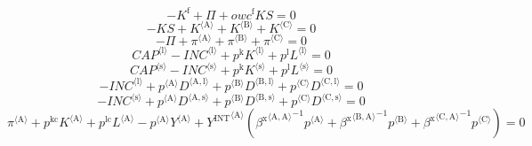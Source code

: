 \begin{equation}
-K^{\mathrm{f}} + \Pi + {{o\!w\!c}^{\mathrm{f}}} {{K\!S}} = 0
\end{equation}
\begin{equation}
-{K\!S} + {K}^{\langle \mathrm{A}\rangle} + {K}^{\langle \mathrm{B}\rangle} + {K}^{\langle \mathrm{C}\rangle} = 0
\end{equation}
\begin{equation}
-\Pi + {\pi}^{\langle \mathrm{A}\rangle} + {\pi}^{\langle \mathrm{B}\rangle} + {\pi}^{\langle \mathrm{C}\rangle} = 0
\end{equation}
\begin{equation}
{{C\!A\!P}}^{\langle \mathrm{l}\rangle} - {{I\!N\!C}}^{\langle \mathrm{l}\rangle} + {p^{\mathrm{k}}} {{K}^{\langle \mathrm{l}\rangle}} + {p^{\mathrm{l}}} {{L}^{\langle \mathrm{l}\rangle}} = 0
\end{equation}
\begin{equation}
{{C\!A\!P}}^{\langle \mathrm{s}\rangle} - {{I\!N\!C}}^{\langle \mathrm{s}\rangle} + {p^{\mathrm{k}}} {{K}^{\langle \mathrm{s}\rangle}} + {p^{\mathrm{l}}} {{L}^{\langle \mathrm{s}\rangle}} = 0
\end{equation}
\begin{equation}
-{{I\!N\!C}}^{\langle \mathrm{l}\rangle} + {{p}^{\langle \mathrm{A}\rangle}} {{D}^{\langle \mathrm{A},\mathrm{l}\rangle}} + {{p}^{\langle \mathrm{B}\rangle}} {{D}^{\langle \mathrm{B},\mathrm{l}\rangle}} + {{p}^{\langle \mathrm{C}\rangle}} {{D}^{\langle \mathrm{C},\mathrm{l}\rangle}} = 0
\end{equation}
\begin{equation}
-{{I\!N\!C}}^{\langle \mathrm{s}\rangle} + {{p}^{\langle \mathrm{A}\rangle}} {{D}^{\langle \mathrm{A},\mathrm{s}\rangle}} + {{p}^{\langle \mathrm{B}\rangle}} {{D}^{\langle \mathrm{B},\mathrm{s}\rangle}} + {{p}^{\langle \mathrm{C}\rangle}} {{D}^{\langle \mathrm{C},\mathrm{s}\rangle}} = 0
\end{equation}
\begin{equation}
{\pi}^{\langle \mathrm{A}\rangle} + {p^{\mathrm{kc}}} {{K}^{\langle \mathrm{A}\rangle}} + {p^{\mathrm{lc}}} {{L}^{\langle \mathrm{A}\rangle}} - {{p}^{\langle \mathrm{A}\rangle}} {{Y}^{\langle \mathrm{A}\rangle}} + {{Y^{\mathrm{INT}}}^{\langle \mathrm{A}\rangle}} \left({{\beta^{\mathrm{x}}}^{\langle \mathrm{\mathrm{A}},\mathrm{\mathrm{A}}\rangle}}^{-1} {{p}^{\langle \mathrm{A}\rangle}} + {{\beta^{\mathrm{x}}}^{\langle \mathrm{\mathrm{B}},\mathrm{\mathrm{A}}\rangle}}^{-1} {{p}^{\langle \mathrm{B}\rangle}} + {{\beta^{\mathrm{x}}}^{\langle \mathrm{\mathrm{C}},\mathrm{\mathrm{A}}\rangle}}^{-1} {{p}^{\langle \mathrm{C}\rangle}}\right) = 0
\end{equation}
